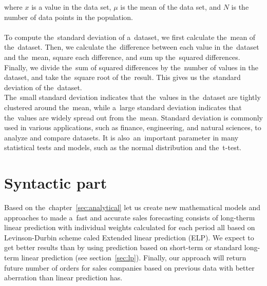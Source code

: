     where $x$ is a value in the data set, $\mu$ is the mean of the data set, and $N$ is the
    number of data points in the population.\\
    \\
    To compute the~standard deviation of a~dataset, we first calculate the~mean of the~dataset.
    Then, we calculate the~difference between each value in the~dataset and the~mean, square each difference, and
    sum up the~squared differences. Finally, we divide the~sum of squared differences by the~number of values in the
    dataset, and take the~square root of the~result. This gives us the~standard deviation of the~dataset.
    \\
    The~small standard deviation indicates that the~values in the~dataset are tightly clustered around the~mean,
    while a~large standard deviation indicates that the~values are widely spread out from the~mean. Standard
    deviation is commonly used in various applications, such as finance, engineering, and natural sciences, to
    analyze and compare datasets. It is also~an~important parameter in many statistical tests and models, such as the
    normal distribution and the~t-test.

\chapter{Syntactic part}\label{sec:syntactic}
Based on the~chapter~\ref{sec:analytical} let us create new mathematical models and approaches to made a~fast
and accurate sales forecasting consists of long-therm linear prediction with individual weights calculated for each
period all based on Levinson-Durbin scheme caled Extended linear prediction (ELP).
We expect to get better results than by using prediction based on short-term or standard long-term linear
prediction (see section~\ref{sec:lp}).  Finally, our approach will return future number of orders for sales companies
based on previous data with better aberration than linear prediction has.
